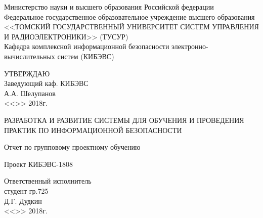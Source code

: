
\begin{titlepage}

\begin{center}
Министерство науки и высшего образования Российской федерации\\
Федеральное государственное образовательное учреждение высшего образования\\
<<ТОМСКИЙ ГОСУДАРСТВЕННЫЙ УНИВЕРСИТЕТ СИСТЕМ УПРАВЛЕНИЯ И РАДИОЭЛЕКТРОНИКИ>> (ТУСУР)\\
Кафедра комплексной информационной безопасности электронно-вычислительных систем (КИБЭВС)\\
\end{center}

\vfill

\begin{flushright}
\begin{minipage}{0.45\textwidth}
 \begin{flushleft}
УТВЕРЖДАЮ\\
Заведующий каф. КИБЭВС\\
\underline{\hspace{2.5cm}} А.А. Шелупанов\\
<<\underline{\hspace{1cm}}>>\underline{\hspace{3cm}} 2018г.\\
 \end{flushleft}
\end{minipage}
\end{flushright}

\vfill

\begin{center}
РАЗРАБОТКА И РАЗВИТИЕ СИСТЕМЫ ДЛЯ ОБУЧЕНИЯ И ПРОВЕДЕНИЯ ПРАКТИК ПО ИНФОРМАЦИОННОЙ БЕЗОПАСНОСТИ

Отчет по групповому проектному обучению

Проект КИБЭВС-1808
\end{center}

\vfill

\begin{flushright}
\begin{minipage}{0.45\textwidth}
 \begin{flushleft}
Ответственный исполнитель\\
студент гр.725\\
\underline{\hspace{3cm}} Д.Г. Дудкин\\
<<\underline{\hspace{1cm}}>> \underline{\hspace{3cm}} 2018г.\\
 \end{flushleft}
\end{minipage}
\end{flushright}


\end{titlepage}
